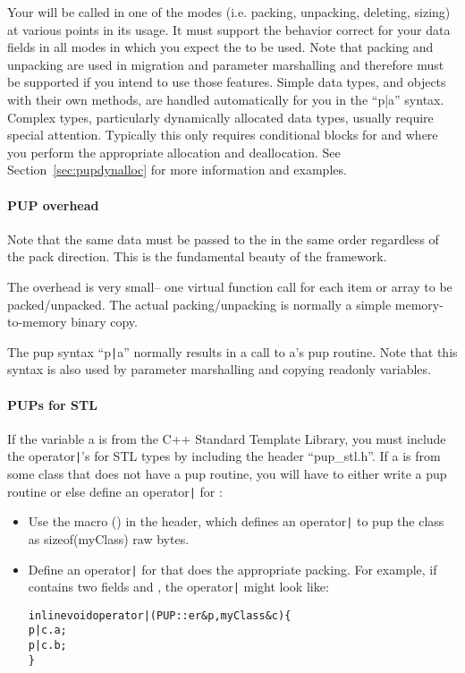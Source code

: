 Your  will be called in one of the modes (i.e. packing,
unpacking, deleting, sizing) at various points in its usage.  It must
support the behavior correct for your data fields in all modes in
which you expect the  to be used.  Note that packing and
unpacking are used in migration and parameter marshalling and
therefore must be supported if you intend to use those features.
Simple data types, and objects with their own
 methods, are handled automatically for you in the ``p|a''
syntax.  Complex types, particularly dynamically allocated data types,
usually require special attention. Typically this only requires
conditional blocks for
 and
 where you perform the appropriate allocation and deallocation.  See Section~\ref{sec:pupdynalloc} for more
information and examples.   



\paragraph{PUP overhead}
\label{sec:pupoverhead}

Note that the same data must be passed to the  
in the same order regardless of the pack direction.
This is the fundamental beauty of the  framework.

The  overhead is very small-- one virtual function call
for each item or array to be packed/unpacked.  The actual packing/unpacking is
normally a simple memory-to-memory binary copy. 

The pup syntax ``p\verb.|.a'' normally results in a call to a's pup routine. 
Note that this syntax is also used by parameter marshalling and copying readonly
variables.

\paragraph{PUPs for STL}
\label{sec:pupstl}

If the variable a is from the C++ Standard Template Library, you must include the 
operator\verb.|.'s for STL types by including the header ``pup\_stl.h''.
If a is from some class  that does not have a pup routine, you will 
have to either write a pup routine or else define an operator\verb.|. for :

\begin{itemize}
\item Use the macro () in the header, which defines
an operator\verb.|. to pup the class as sizeof(myClass) raw bytes.
\item Define an operator\verb.|. for  that does the appropriate packing.
For example, if  contains two fields  and , the 
operator\verb.|. might look like:

\begin{alltt}
  inline void operator|(PUP::er &p,myClass &c) \{
    p|c.a;
    p|c.b;
  \}
\end{alltt}

\end{itemize}

